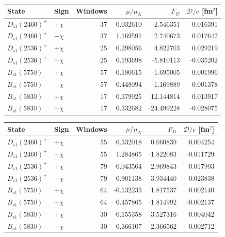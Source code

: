 \begin{tabular}{llrrrr}
\toprule
State & Sign & Windows & $\mu/\mu_N$ & $F_D$ & $\mathcal D/e$ [fm$^2$] \\
\midrule
$D_{s1}(2460)^+$ & $+\chi$ & 37 & 0.032610 & -2.546351 & -0.016391 \\
$D_{s1}(2460)^+$ & $-\chi$ & 37 & 1.169591 & 2.740673 & 0.017642 \\
$D_{s1}(2536)^+$ & $+\chi$ & 25 & 0.298056 & 4.822703 & 0.029219 \\
$D_{s1}(2536)^+$ & $-\chi$ & 25 & 0.193698 & -5.810113 & -0.035202 \\
$B_{s1}(5750)$ & $+\chi$ & 57 & -0.180615 & -1.695005 & -0.001996 \\
$B_{s1}(5750)$ & $-\chi$ & 57 & 0.448094 & 1.169889 & 0.001378 \\
$B_{s1}(5830)$ & $+\chi$ & 17 & 0.379925 & 12.144814 & 0.013917 \\
$B_{s1}(5830)$ & $-\chi$ & 17 & 0.332682 & -24.499228 & -0.028075 \\
\bottomrule
\end{tabular}


\begin{tabular}{llrrrr}
\toprule
State & Sign & Windows & $\mu/\mu_N$ & $F_D$ & $\mathcal D/e$ [fm$^2$] \\
\midrule
$D_{s1}(2460)^+$ & $+\chi$ & 55 & 0.332018 & 0.660839 & 0.004254 \\
$D_{s1}(2460)^+$ & $-\chi$ & 55 & 1.284865 & -1.822083 & -0.011729 \\
$D_{s1}(2536)^+$ & $+\chi$ & 79 & -0.043564 & -2.969843 & -0.017993 \\
$D_{s1}(2536)^+$ & $-\chi$ & 79 & 0.901138 & 3.934440 & 0.023838 \\
$B_{s1}(5750)$ & $+\chi$ & 64 & -0.132233 & 1.817537 & 0.002140 \\
$B_{s1}(5750)$ & $-\chi$ & 64 & 0.457865 & -1.814992 & -0.002137 \\
$B_{s1}(5830)$ & $+\chi$ & 30 & -0.155358 & -3.527316 & -0.004042 \\
$B_{s1}(5830)$ & $-\chi$ & 30 & 0.366107 & 2.366562 & 0.002712 \\
\bottomrule
\end{tabular}
